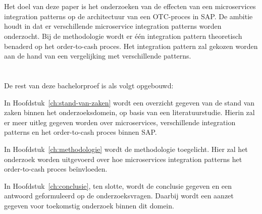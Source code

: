 \section{}
\label{sec:onderzoeksdoelstelling}
Het doel van deze paper is het onderzoeken van de effecten van een microservices integration patterns op de architectuur van een OTC-proces in SAP. De ambitie houdt in dat er verschillende microservice integration patterns worden onderzocht. Bij de methodologie wordt er één integration pattern theoretisch benaderd op het order-to-cash proces. Het integration pattern zal gekozen worden aan de hand van een vergelijking met verschillende patterns.

\section{}
\label{sec:opzet-bachelorproef}


De rest van deze bachelorproef is als volgt opgebouwd:

In Hoofdstuk~\ref{ch:stand-van-zaken} wordt een overzicht gegeven van de stand van zaken binnen het onderzoeksdomein, op basis van een literatuurstudie. Hierin zal er meer uitleg gegeven worden over microservices, verschillende integration patterns en het order-to-cash proces binnen SAP.

In Hoofdstuk~\ref{ch:methodologie} wordt de methodologie toegelicht.  Hier zal het onderzoek worden uitgevoerd over hoe microservices integration patterns het order-to-cash proces beïnvloeden. 


In Hoofdstuk~\ref{ch:conclusie}, ten slotte, wordt de conclusie gegeven en een antwoord geformuleerd op de onderzoeksvragen. Daarbij wordt een aanzet gegeven voor toekomstig onderzoek binnen dit domein.
